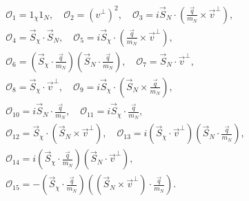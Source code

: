 \documentclass[reprint, showpacs,
preprintnumbers,
amsmath,amssymb,
aps, floatfix,
superscriptaddress,
prd, nofootinbib]{revtex4-1}
\begin{document}
\begin{equation}
\begin{array}{l}
{\mathcal{O}_{1}=1_\chi 1_N},\quad
{\mathcal{O}_{2}=\left(v^{\perp}\right)^{2}}, \quad
{\mathcal{O}_{3}=i \vec{S}_{N} \cdot\left(\frac{\vec{q}}{m_N} \times \vec{v}^{\perp}\right)}, \\ 
{\mathcal{O}_{4}=\vec{S}_{\chi} \cdot \vec{S}_{N}}, \quad
{\mathcal{O}_{5}=i \vec{S}_{\chi} \cdot(\frac{\vec{q}}{m_N} \times \vec{v}^{\perp})}, \\ 
{\mathcal{O}_{6}=\left(\vec{S}_{\chi} \cdot \frac{\vec{q}}{m_N}\right)\left(\vec{S}_{N} \cdot \frac{\vec{q}}{m_N}\right)}, \quad
{\mathcal{O}_{7}=\vec{S}_{N} \cdot \vec{v}^{\perp}}, \\
{\mathcal{O}_{8}=\vec{S}_{\chi} \cdot \vec{v}^{\perp}}, \quad
{\mathcal{O}_{9}=i \vec{S}_{\chi} \cdot\left(\vec{S}_{N} \times \frac{\vec{q}}{m_N}\right)}, \\
{\mathcal{O}_{10}=i \vec{S}_{N} \cdot \frac{\vec{q}}{m_N}}, \quad 
{\mathcal{O}_{11}=i \vec{S}_{\chi} \cdot \frac{\vec{q}}{m_N}}, \\

{\mathcal{O}_{12} =\vec{S}_{\chi} \cdot\left(\vec{S}_{N} \times \vec{v}^{\perp}\right)}, \quad
{\mathcal{O}_{13} =i\left(\vec{S}_{\chi} \cdot \vec{v}^{\perp}\right)\left(\vec{S}_{N} \cdot \frac{\vec{q}}{m_N}\right)}, \\
{\mathcal{O}_{14} =i\left(\vec{S}_{\chi} \cdot \frac{\vec{q}}{m_N}\right)\left(\vec{S}_{N} \cdot \vec{v}^{\perp}\right)}, \\
{\mathcal{O}_{15} =-\left(\vec{S}_{\chi} \cdot \frac{\vec{q}}{m_N}\right)\left(\left(\vec{S}_{N} \times \vec{v}^{\perp}\right) \cdot \frac{\vec{q}}{m_N}\right)} .
\end{array}
\label{eq:operators}
\end{equation}
\end{document}
